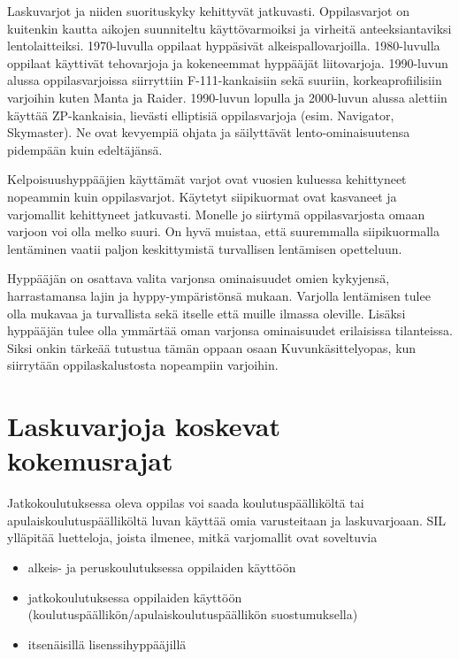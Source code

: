 
Laskuvarjot ja niiden suorituskyky kehittyvät jatkuvasti. Oppilasvarjot on kuitenkin kautta aikojen suunniteltu käyttövarmoiksi ja virheitä anteeksiantaviksi lentolaitteiksi. 1970-luvulla oppilaat hyppäsivät alkeispallovarjoilla. 1980-luvulla oppilaat käyttivät tehovarjoja ja kokeneemmat hyppääjät liitovarjoja. 1990-luvun alussa oppilasvarjoissa siirryttiin F-111-kankaisiin sekä suuriin, korkeaprofiilisiin varjoihin kuten Manta ja Raider. 1990-luvun lopulla ja 2000-luvun alussa alettiin käyttää ZP-kankaisia, lievästi elliptisiä oppilasvarjoja (esim. Navigator, Skymaster). Ne ovat kevyempiä ohjata ja säilyttävät lento-ominaisuutensa pidempään kuin edeltäjänsä. 


Kelpoisuushyppääjien käyttämät varjot ovat vuosien kuluessa kehittyneet nopeammin kuin oppilasvarjot. Käytetyt siipikuormat ovat kasvaneet ja varjomallit kehittyneet jatkuvasti. Monelle jo siirtymä oppilasvarjosta omaan varjoon voi olla melko suuri. On hyvä muistaa, että suuremmalla siipikuormalla lentäminen vaatii paljon keskittymistä turvallisen lentämisen opetteluun.  


Hyppääjän on osattava valita varjonsa ominaisuudet omien kykyjensä, harrastamansa lajin ja hyppy-ympäristönsä mukaan. Varjolla lentämisen tulee olla mukavaa ja turvallista sekä itselle että muille ilmassa oleville. Lisäksi hyppääjän tulee olla ymmärtää oman varjonsa ominaisuudet erilaisissa tilanteissa. Siksi onkin tärkeää tutustua tämän oppaan osaan Kuvunkäsittelyopas, kun siirrytään oppilaskalustosta nopeampiin varjoihin. 

\section{ Laskuvarjoja koskevat kokemusrajat }
\label{omiin-varusteisiin-siirtyminen-laskuvarjoja-koskevat-kokemusrajat}


Jatkokoulutuksessa oleva oppilas voi saada koulutuspäälliköltä tai apulaiskoulutuspäälliköltä luvan käyttää omia varusteitaan ja laskuvarjoaan. SIL ylläpitää luetteloja, joista ilmenee, mitkä varjomallit ovat soveltuvia 

\begin{itemize}
\item  alkeis- ja peruskoulutuksessa oppilaiden käyttöön 
\item  jatkokoulutuksessa oppilaiden käyttöön (koulutuspäällikön/apulaiskoulutuspäällikön suostumuksella)  
\item  itsenäisillä lisenssihyppääjillä  
\end{itemize}

